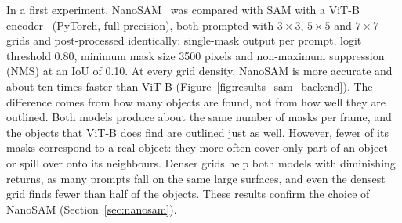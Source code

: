 {\small In a first experiment, NanoSAM~\cite{nanosam2023} was compared with SAM with a ViT-B encoder~\cite{kirillov2023segmentanything} (PyTorch, full precision), both prompted with $3 \times 3$, $5 \times 5$ and $7 \times 7$ grids and post-processed identically: single-mask output per prompt, logit threshold 0.80, minimum mask size 3500 pixels and non-maximum suppression (NMS) at an IoU of 0.10. At every grid density, NanoSAM is more accurate and about ten times faster than ViT-B (Figure~\ref{fig:results_sam_backend}). The difference comes from how many objects are found, not from how well they are outlined. Both models produce about the same number of masks per frame, and the objects that ViT-B does find are outlined just as well. However, fewer of its masks correspond to a real object: they more often cover only part of an object or spill over onto its neighbours. Denser grids help both models with diminishing returns, as many prompts fall on the same large surfaces, and even the densest grid finds fewer than half of the objects. These results confirm the choice of NanoSAM (Section~\ref{sec:nanosam}).\par}

